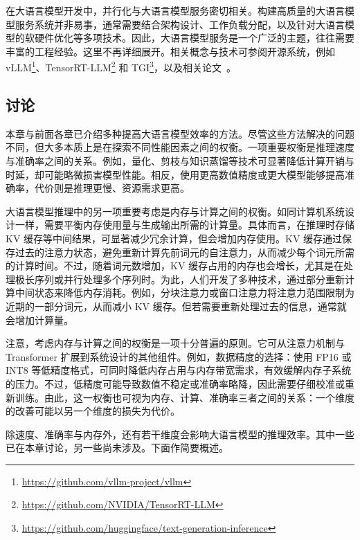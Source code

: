 在大语言模型开发中，并行化与大语言模型服务密切相关。构建高质量的大语言模型服务系统并非易事，通常需要结合架构设计、工作负载分配，以及针对大语言模型的软硬件优化等多项技术。因此，大语言模型服务是一个广泛的主题，往往需要丰富的工程经验。这里不再详细展开。相关概念与技术可参阅开源系统，例如 vLLM\footnote{\url{https://github.com/vllm-project/vllm}}、TensorRT-LLM\footnote{\url{https://github.com/NVIDIA/TensorRT-LLM}} 和 TGI\footnote{\url{https://github.com/huggingface/text-generation-inference}}，以及相关论文~\cite{pope-etal:2023efficiently,li-etal:2024llm}。

\subsection{讨论}

本章与前面各章已介绍多种提高大语言模型效率的方法。尽管这些方法解决的问题不同，但大多本质上是在探索不同性能因素之间的权衡。一项重要权衡是推理速度与准确率之间的关系。例如，量化、剪枝与知识蒸馏等技术可显著降低计算开销与时延，却可能略微损害模型性能。相反，使用更高数值精度或更大模型能够提高准确率，代价则是推理更慢、资源需求更高。

大语言模型推理中的另一项重要考虑是内存与计算之间的权衡。如同计算机系统设计一样，需要平衡内存使用量与生成输出所需的计算量。具体而言，在推理时存储 KV 缓存等中间结果，可显著减少冗余计算，但会增加内存使用。KV 缓存通过保存过去的注意力状态，避免重新计算先前词元的自注意力，从而减少每个词元所需的计算时间。不过，随着词元数增加，KV 缓存占用的内存也会增长，尤其是在处理极长序列或并行处理多个序列时。为此，人们开发了多种技术，通过部分重新计算中间状态来降低内存消耗。例如，分块注意力或窗口注意力将注意力范围限制为近期的一部分词元，从而减小 KV 缓存。但若需要重新处理过去的信息，通常就会增加计算量。

注意，考虑内存与计算之间的权衡是一项十分普遍的原则。它可从注意力机制与 Transformer 扩展到系统设计的其他组件。例如，数据精度的选择：使用 FP16 或 INT8 等低精度格式，可同时降低内存占用与内存带宽需求，有效缓解内存子系统的压力。不过，低精度可能导致数值不稳定或准确率略降，因此需要仔细校准或重新训练。由此，这一权衡也可视为内存、计算、准确率三者之间的关系：一个维度的改善可能以另一个维度的损失为代价。

除速度、准确率与内存外，还有若干维度会影响大语言模型的推理效率。其中一些已在本章讨论，另一些尚未涉及。下面作简要概述。

